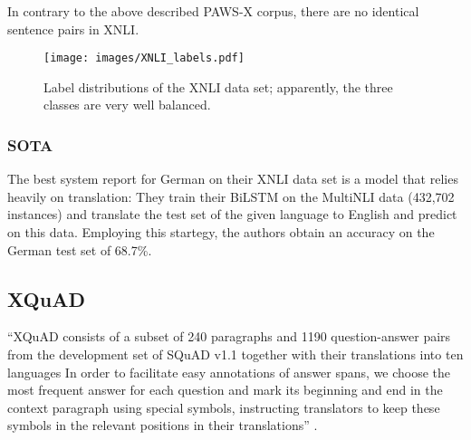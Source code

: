 In contrary to the above described PAWS-X corpus, there are no identical sentence pairs in XNLI.

\begin{wrapfigure}{r}{0.55\linewidth}
  \begin{center}
    \texttt{[image: images/XNLI\_labels.pdf]}
  \end{center}
  \caption[XNLI labels]{Label distributions of the XNLI data set; apparently, the three classes are very well balanced.}
\end{wrapfigure}

\subsubsection{SOTA}

The best system \cite{conneau2018xnli} report for German on their XNLI data set is a model that
relies heavily on translation:
They train their BiLSTM on the MultiNLI data (432,702 instances) and translate the test set of the
given language to English and predict on this data.
Employing this startegy, the authors obtain an accuracy on the German test set of 68.7\%.



\subsection{XQuAD}

``XQuAD consists of a subset of 240 paragraphs and 1190 question-answer pairs from the development
set of SQuAD v1.1 together with their translations into ten languages \textelp{} In order to
facilitate easy annotations of answer spans, we choose the most frequent answer for each question
and mark its beginning and end in the context paragraph using special symbols, instructing
translators to keep these symbols in the relevant positions in their translations''
\cite{artetxe2019cross}.

